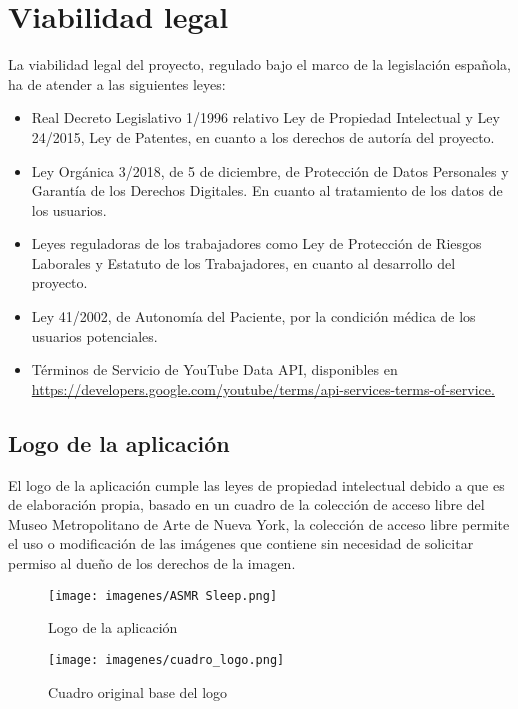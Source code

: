 \documentclass[a4paper,12pt,twoside]{memoir}
\begin{document}
\section{Viabilidad legal}
La viabilidad legal del proyecto, regulado bajo el marco de la legislación española, ha de atender a las siguientes leyes:
\begin{itemize}
    \item Real Decreto Legislativo 1/1996 \cite{boe1996} relativo Ley de Propiedad Intelectual y Ley 24/2015, Ley de Patentes, en cuanto a los derechos de autoría del proyecto. \cite{Ley24/2015}
    \item Ley Orgánica 3/2018, de 5 de diciembre, de Protección de Datos Personales y Garantía de los Derechos Digitales. \cite{boe-2018} En cuanto al tratamiento de los datos de los usuarios.
    \item Leyes reguladoras de los trabajadores como Ley de Protección de Riesgos Laborales y Estatuto de los Trabajadores, en cuanto al desarrollo del proyecto.\cite{boe2015}
    \item Ley 41/2002, de Autonomía del Paciente, por la condición médica de los usuarios potenciales.\cite{Ley41/2002}
    \item Términos de Servicio de YouTube Data API, disponibles en \\ \url{https://developers.google.com/youtube/terms/api-services-terms-of-service.}
\end{itemize}

\subsection{Logo de la aplicación}
El logo de la aplicación cumple las leyes de propiedad intelectual debido a que es de elaboración propia, basado en un cuadro de la colección de acceso libre del Museo Metropolitano de Arte de Nueva York, la colección de acceso libre permite el uso o modificación de las imágenes que contiene sin necesidad de solicitar permiso al dueño de los derechos de la imagen. \cite{Met}
 
 \begin{figure}
        \centering
        \texttt{[image: imagenes/ASMR Sleep.png]} 
        \caption{Logo de la aplicación}
        \label{fig:ejemplo}
    \end{figure}


 \begin{figure}
        \centering
        \texttt{[image: imagenes/cuadro\_logo.png]} 
        \caption{Cuadro original base del logo}
        \label{fig:ejemplo}
    \end{figure}
\end{document}
